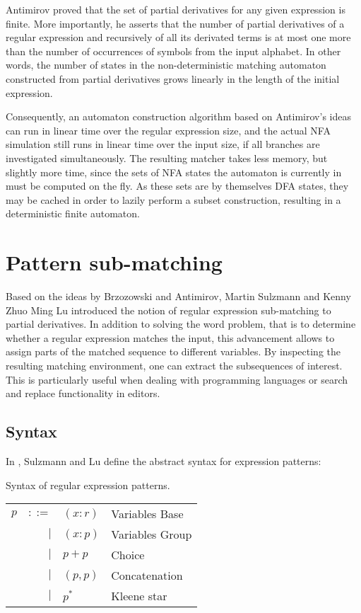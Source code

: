 Antimirov proved that the set of partial derivatives for any given expression is
finite. More importantly, he asserts that the number of partial derivatives of a
regular expression and recursively of all its derivated terms is at most one
more than the number of occurrences of symbols from the input alphabet. In other
words, the number of states in the non-deterministic matching automaton
constructed from partial derivatives grows linearly in the length of the initial
expression.

Consequently, an automaton construction algorithm based on Antimirov's ideas can
run in linear time over the regular expression size, and the actual NFA
simulation still runs in linear time over the input size, if all branches are
investigated simultaneously. The resulting matcher takes less memory, but
slightly more time, since the sets of NFA states the automaton is currently in
must be computed on the fly. As these sets are by themselves DFA states, they
may be cached in order to lazily perform a subset construction, resulting in a
deterministic finite automaton.


\section{Pattern sub-matching}

Based on the ideas by Brzozowski and Antimirov, Martin Sulzmann and Kenny Zhuo
Ming Lu introduced the notion of regular expression sub-matching to partial
derivatives. In addition to solving the word problem, that is to determine
whether a regular expression matches the input, this advancement allows to
assign parts of the matched sequence to different variables. By inspecting the
resulting matching environment, one can extract the subsequences of interest.
This is particularly useful when dealing with programming languages or search
and replace functionality in editors.

\subsection{Syntax}

In \cite{pdpat}, Sulzmann and Lu define the abstract syntax for expression
patterns:

\begin{defn}
   \label{defn-pat}
   Syntax of regular expression patterns.

   \begin{tabular}{lrll}
      $p$	& $::=$	& $(x:r)$	& Variables Base	\\
		& $|$	& $(x:p)$	& Variables Group	\\
		& $|$	& $p+p$		& Choice		\\
		& $|$	& $(p,p)$	& Concatenation		\\
		& $|$	& $p^*$		& Kleene star		\\
   \end{tabular}
\end{defn}

